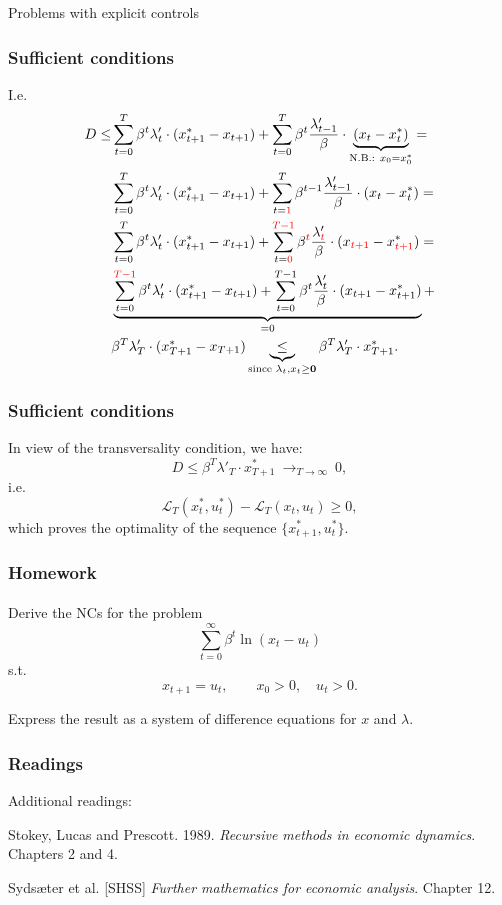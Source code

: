 \documentclass[10pt]{beamer}
\theoremstyle{definition}
\begin{document}
\begin{section}{Problems with explicit controls}
\begin{frame}[fragile]
\frametitle{Sufficient conditions}
I.e. \begin{equation*}
\begin{split}
 D \leq &   \sum_{t=0}^{T}\beta^t \lambda'_t \cdot (x^*_{t+1} - x_{t+1} ) +  \sum_{t=0}^{T}\beta^t \frac{\lambda'_{t-1}}{\beta}\cdot\underbrace{(x_t-x_t^*)}_{\text{N.B.: } x_0 = x^*_0} = \\
&  \sum_{t=0}^{T}\beta^t \lambda'_t \cdot (x^*_{t+1} - x_{t+1} ) +  \sum_{t = {\color{red}1}}^{T}\beta^{t-1} \frac{\lambda'_{t-1}}{\beta}\cdot(x_t-x_t^*)= \\
&  \sum_{t=0}^{T}\beta^t \lambda'_t \cdot (x^*_{t+1} - x_{t+1} ) +  \sum_{t = {\color{red} 0}}^{{\color{red} T-1}}\beta^{{\color{red} t}} \frac{\lambda'_{{\color{red} t}}}{\beta}\cdot(x_{{\color{red} t+1}}-x_{{\color{red} t+1}}^*)= \\
& \underbrace{\sum_{t=0}^{{\color{red} T-1}}\beta^t \lambda'_t \cdot (x^*_{t+1} - x_{t+1}) +  \sum_{t = 0}^{T-1}\beta^{t} \frac{\lambda'_{t}}{\beta}\cdot(x_{ t+1}-x_{t+1}^*)}_{=0} + \\
& \beta^T \lambda'_T \cdot (x^*_{T+1} - x_{T+1})  \underbrace{\leq}_{\text{since }\lambda_t,x_t \geq \mathbf{0}} \beta^T \lambda'_T \cdot x^*_{T+1}.
\end{split}
\end{equation*}
\end{frame}


\begin{frame}[fragile]
\frametitle{Sufficient conditions}
In view of the transversality condition, we have: \begin{equation*}
 D \leq  \beta^T \lambda'_T \cdot x^*_{T+1} ~ \mathop{\longrightarrow}_{T \rightarrow \infty} ~0 ,
\end{equation*}
i.e. 
\[  \mathcal{L}_T(x^*_t,u^*_t) - \mathcal{L}_T (x_t,u_t) \geq 0, \] which proves the optimality of the sequence
$\{x^*_{t+1},u^*_t\}$.
\end{frame}
\end{section}

\begin{frame}[fragile]
\frametitle{Homework}
\framesubtitle{}
Derive the NCs for the problem 
\[ \sum_{t=0}^{\infty}\beta^t \ln (x_t-u_t) \]
s.t.
\[ x_{t+1}=u_t,\qquad x_0>0,\quad u_t>0. \]

Express the result as a system of difference equations for $ x $ and $ \lambda $.
\end{frame}


\begin{frame}[fragile]
\frametitle{Readings}
Additional readings:\bigskip

Stokey, Lucas and Prescott. 1989. \emph{Recursive methods in economic dynamics}. Chapters 2 and 4.\bigskip

Syds\ae{}ter et al. [SHSS] \emph{Further mathematics for economic analysis}. Chapter 12.\bigskip
\end{frame}
\end{document}

